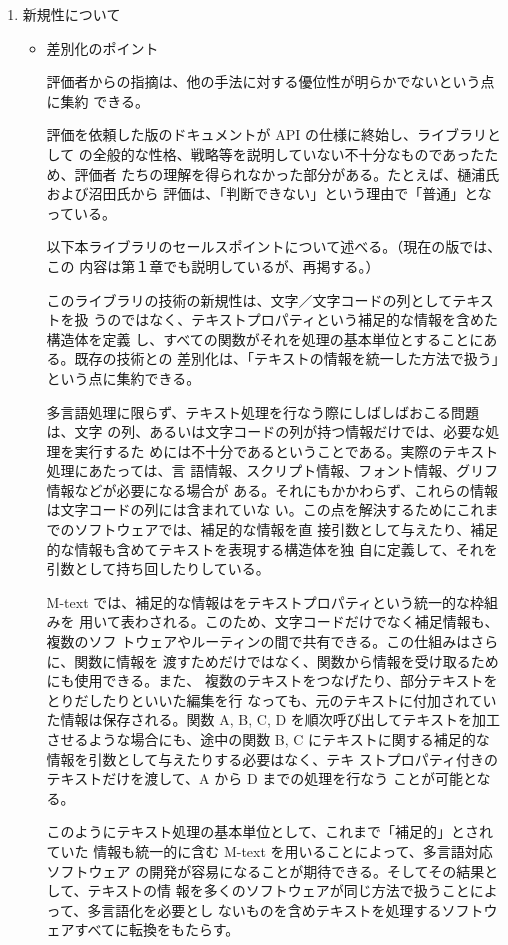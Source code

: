 \begin{enumerate}
\item  新規性について
\begin{itemize}
\item 差別化のポイント

評価者からの指摘は、他の手法に対する優位性が明らかでないという点に集約
できる。

評価を依頼した版のドキュメントが API の仕様に終始し、ライブラリとして
の全般的な性格、戦略等を説明していない不十分なものであったため、評価者
たちの理解を得られなかった部分がある。たとえば、樋浦氏および沼田氏から
評価は、「判断できない」という理由で「普通」となっている。

以下本ライブラリのセールスポイントについて述べる。（現在の版では、この
内容は第１章でも説明しているが、再掲する。）

このライブラリの技術の新規性は、文字／文字コードの列としてテキストを扱
うのではなく、テキストプロパティという補足的な情報を含めた構造体を定義
し、すべての関数がそれを処理の基本単位とすることにある。既存の技術との
差別化は、「テキストの情報を統一した方法で扱う」という点に集約できる。

多言語処理に限らず、テキスト処理を行なう際にしばしばおこる問題は、文字
の列、あるいは文字コードの列が持つ情報だけでは、必要な処理を実行するた
めには不十分であるということである。実際のテキスト処理にあたっては、言
語情報、スクリプト情報、フォント情報、グリフ情報などが必要になる場合が
ある。それにもかかわらず、これらの情報は文字コードの列には含まれていな
い。この点を解決するためにこれまでのソフトウェアでは、補足的な情報を直
接引数として与えたり、補足的な情報も含めてテキストを表現する構造体を独
自に定義して、それを引数として持ち回したりしている。

M-text では、補足的な情報はをテキストプロパティという統一的な枠組みを
用いて表わされる。このため、文字コードだけでなく補足情報も、複数のソフ
トウェアやルーティンの間で共有できる。この仕組みはさらに、関数に情報を
渡すためだけではなく、関数から情報を受け取るためにも使用できる。また、
複数のテキストをつなげたり、部分テキストをとりだしたりといいた編集を行
なっても、元のテキストに付加されていた情報は保存される。関数 A, B, C,
D を順次呼び出してテキストを加工させるような場合にも、途中の関数 B, C 
にテキストに関する補足的な情報を引数として与えたりする必要はなく、テキ
ストプロパティ付きのテキストだけを渡して、A から D までの処理を行なう
ことが可能となる。

このようにテキスト処理の基本単位として、これまで「補足的」とされていた
情報も統一的に含む M-text を用いることによって、多言語対応ソフトウェア
の開発が容易になることが期待できる。そしてその結果として、テキストの情
報を多くのソフトウェアが同じ方法で扱うことによって、多言語化を必要とし
ないものを含めテキストを処理するソフトウェアすべてに転換をもたらす。


\end{itemize}
\end{enumerate}
